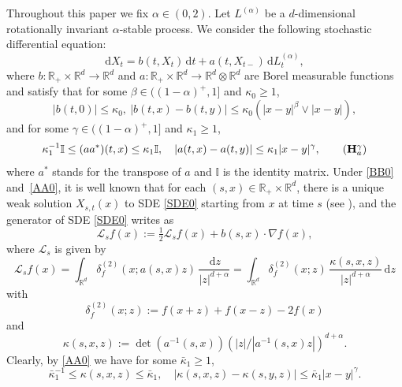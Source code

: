 \documentclass[JEP,XML,SOM,Unicode,published]{cedram}
\newcommand{\rd}{\mathrm{d}}
\theoremstyle{plain}
\theoremstyle{definition}
\newcommand\cL{{\mathcal L}}
\newcommand\mI{\mathbb{I}}
\newcommand\mR{\mathbb{R}}
\newcommand\1{{\mathbf{1}}}
\newcommand\sL{{\mathscr L}}
\newcommand{\dif}{\,\mathrm{d}}
\begin{document}
Throughout this paper we fix $\alpha\in(0,2)$. Let $L^{(\alpha)}$ be a $d$-dimensional rotationally invariant $\alpha$-stable process.
We consider the following stochastic differential equation:
\begin{equation}\label{SDE0}
\rd X_t=b(t,X_t)\dif t+a(t,X_{t-})\dif L^{(\alpha)}_t,
\end{equation}
where $b:\mR_+\times\mR^d\to\mR^d$ and $a:\mR_+\times\mR^d\to\mR^d\otimes\mR^d$ are Borel measurable functions and satisfy
that for some $\beta\in((1-\alpha)^+,1]$ and $\kappa_0\geq 1$,
\begin{equation}\label{BB0}
|b(t,0)|\le \kappa_0,\ |b(t,x)-b(t,y)|\leq\kappa_0(|x-y|^\beta\vee|x-y|),\tag{$\mathbf H^\beta_b$}
\end{equation}
and
for some $\gamma\in((1-\alpha)^+,1]$ and $\kappa_1\geq 1$,
\begin{equation}\label{AA0}
\kappa_1^{-1}\mI\leq (aa^*)(t,x)\leq\kappa_1\mI,\quad |a(t,x)-a(t,y)|\leq\kappa_1|x-y|^{\gamma}, \tag{$\mathbf H^{\gamma}_a$}
\end{equation}
where $a^*$ stands for the transpose of $a$ and $\mI$ is the identity matrix.
Under \eqref{BB0} and~\eqref{AA0}, it is well known that
for each $(s,x)\in\mR_+\times\mR^d$,
there is a unique weak solution
$X_{s,t}(x)$ to SDE \eqref{SDE0} starting from $x$ at time $s$ (see \eg \cite[Th.\,1.1]{CZZ}),
and the generator of SDE \eqref{SDE0} writes as
\begin{equation*}
\sL_{s} f(x):=\tfrac12\cL_{s} f(x)+b(s,x)\cdot\nabla f(x),
\end{equation*}
where $\cL_{s}$ is given by\vspace*{-3pt}
\begin{equation}\label{GEN_STABLE_LIKE}
\cL_{s} f(x)=\int_{\mR^d}\delta^{(2)}_f(x;a(s,x)z)\,\frac{\dif z}{|z|^{d+\alpha}}=\int_{\mR^d}\delta^{(2)}_f(x;z)\,\frac{\kappa(s,x,z)}{|z|^{d+\alpha}}\,\rd z
\end{equation}
with\vspace*{-3pt}
\begin{equation}\label{DEF_DELTA_2}
\delta^{(2)}_f(x;z):=f(x+z)+f(x-z)-2f(x)
\end{equation}
and\vspace*{-3pt}
\begin{equation}\label{KA1}
\kappa(s,x,z):=\det(a^{-1}(s,x))(|z|/|a^{-1}(s,x)z|)^{d+\alpha}.
\end{equation}
Clearly, by \eqref{AA0} we have for some $\bar\kappa_1\geq 1$,
\begin{equation}\label{AA2}
\bar\kappa^{-1}_1\leq \kappa(s,x,z)\leq\bar\kappa_1,\quad |\kappa(s,x,z)-\kappa(s,y,z)|\leq\bar\kappa_1|x-y|^{\gamma}.
\end{equation}
\end{document}
